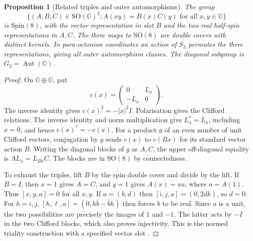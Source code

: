 \documentclass[aps,pra,onecolumn,superscriptaddress,nofootinbib,10pt]{revtex4-2}
\newtheorem{proposition}[theorem]{Proposition}
\theoremstyle{definition}
\theoremstyle{remark}
\newcommand{\SO}{\mathrm{SO}}
\begin{document}
\begin{proposition}[Related triples and outer automorphisms]\label{tr:triples}
The group
\[
 \{(A,B,C)\in\SO(\mathbb O)^3:
                    A(xy)=B(x)C(y)\text{ for all }x,y\in\mathbb O\}
\]
is \(\mathrm{Spin}(8)\), with the vector representation in slot \(B\)
and the two real half-spin representations in \(A,C\).
The three maps to \(\SO(8)\) are double covers with distinct
kernels. In para-octonion coordinates an action of \(S_3\) permutes
the three representations, giving all outer automorphism classes.
The diagonal subgroup is \(G_2=\operatorname{Aut}(\mathbb O)\).
\end{proposition}
\begin{proof}
On \(\mathbb O\oplus\mathbb O\), put
\[
 c(x)=\begin{pmatrix}0&L_x\\-L_{\bar x}&0\end{pmatrix}.
\]
The inverse identity gives \(c(x)^2=-|x|^2I\).
Polarisation gives the Clifford relations. The inverse identity
and norm multiplication give \(L_x^*=L_{\bar x}\), including
\(x=0\), and hence \(c(x)^*=-c(x)\).
For a product \(g\) of an even number of unit Clifford vectors,
conjugation by \(g\) sends \(c(x)\) to \(c(Bx)\) for its standard
vector action \(B\). Writing the diagonal blocks of \(g\) as \(A,C\),
the upper off-diagonal equality is \(A L_x=L_{Bx}C\).
The blocks are in \(\SO(8)\) by connectedness.

To exhaust the triples, lift \(B\) by the spin double cover
and divide by the lift. If \(B=I\), then \(x=1\) gives \(A=C\),
and \(y=1\) gives \(A(x)=xa\), where \(a=A(1)\).
Thus \([x,y,a]=0\) for all \(x,y\). If \(a=(b,d)\) then
\([i,j,a]=(0,2dk)\), so \(d=0\). For \(h=i,j\),
\([h,\ell,a]=(0,h\bar b-\bar b h)\) then forces \(b\) to be real.
Since \(a\) is a unit, the two possibilities are precisely the
images of \(1\) and \(-1\). The latter acts by \(-I\) in the
two Clifford blocks, which also proves injectivity.
This is the normed triality construction with a specified
vector slot \cite[\S2.4]{Baez}.


\end{proof}
\end{document}
